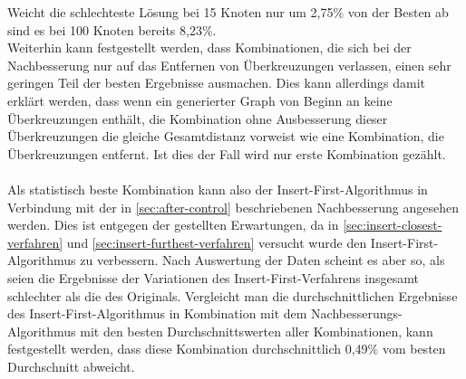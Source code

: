 Weicht die schlechteste Lösung bei 15 Knoten nur um 2,75\% von der Besten ab sind es bei 100 Knoten bereits 8,23\%.
\\
Weiterhin kann festgestellt werden, dass Kombinationen, die sich bei der Nachbesserung nur auf das Entfernen von Überkreuzungen verlassen, einen sehr geringen Teil der besten Ergebnisse ausmachen.
Dies kann allerdings damit erklärt werden, dass wenn ein generierter Graph von Beginn an keine Überkreuzungen enthält, die Kombination ohne Ausbesserung dieser Überkreuzungen die gleiche Gesamtdistanz vorweist wie eine Kombination, die Überkreuzungen entfernt.
Ist dies der Fall wird nur erste Kombination gezählt.
\\\\
Als statistisch beste Kombination kann also der Insert-First-Algorithmus in Verbindung mit der in \vref{sec:after-control} beschriebenen Nachbesserung angesehen werden.
Dies ist entgegen der gestellten Erwartungen, da in \vref{sec:insert-closest-verfahren} und \vref{sec:insert-furthest-verfahren} versucht wurde den Insert-First-Algorithmus zu verbessern.
Nach Auswertung der Daten scheint es aber so, als seien die Ergebnisse der Variationen des Insert-First-Verfahrens insgesamt schlechter als die des Originals.
Vergleicht man die durchschnittlichen Ergebnisse des Insert-First-Algorithmus in Kombination mit dem Nachbesserungs-Algorithmus mit den besten Durchschnittswerten aller Kombinationen, kann festgestellt werden, dass diese Kombination durchschnittlich 0,49\% vom besten Durchschnitt abweicht.




